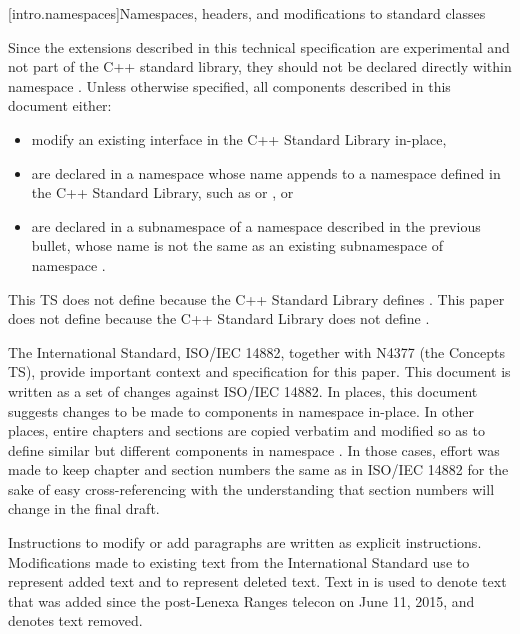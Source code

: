 {\color{newclr}
[intro.namespaces]{Namespaces, headers, and modifications to standard classes}

\pnum
Since the extensions described in this technical specification are experimental and not
part of the C++ standard library, they should not be declared directly within namespace
. Unless otherwise specified, all components described in this document either:

\begin{itemize}
\item modify an existing interface in the C++ Standard Library in-place,
\item are declared in a namespace whose name appends  to
a namespace defined in the C++ Standard Library, such as  or ,
or
\item are declared in a subnamespace of a namespace described in the previous bullet, whose
name is not the same as an existing subnamespace of namespace .
\end{itemize}

\enterexample This TS does not define  because
the C++ Standard Library defines . This paper does not define
 because the C++ Standard Library does not define
.\exitexample
}


\pnum
The International Standard, ISO/IEC 14882, together with N4377 (the Concepts TS),
provide important context and specification for this paper. This document is written
as a set of changes against ISO/IEC 14882. In places, this document suggests
changes to be made to components in namespace  in-place. In
other places, entire chapters and sections are copied verbatim and modified so as to
define similar but different components in namespace .
In those cases, effort was made to keep chapter and section numbers the same as in
ISO/IEC 14882 for the sake of easy cross-referencing with the understanding that
section numbers will change in the final draft.

\pnum
Instructions to modify or add paragraphs are written as explicit instructions.
Modifications made to existing text from the International Standard use
 to represent added text and  to
represent deleted text. Text in  is used to denote text that
was added since the post-Lenexa Ranges telecon on June 11, 2015, and
 denotes text removed.

